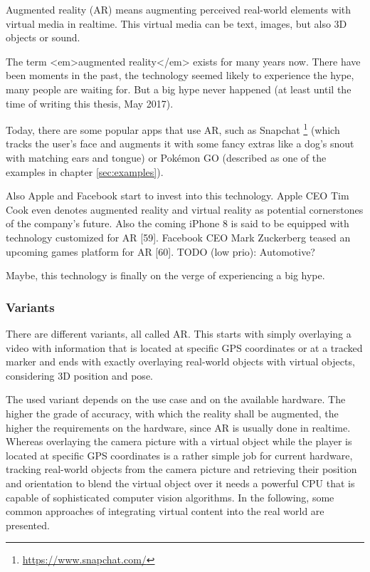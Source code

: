 Augmented reality (AR) means augmenting perceived real-world elements with virtual media in realtime. This virtual media can be text, images, but also 3D objects or sound.

The term <em>augmented reality</em> exists for many years now. There have been moments in the past, the technology seemed likely to experience the hype, many people are waiting for. But a big hype never happened (at least until the time of writing this thesis, May 2017).

Today, there are some popular apps that use AR, such as Snapchat \footnote{\url{https://www.snapchat.com/}} (which tracks the user's face and augments it with some fancy extras like a dog's snout with matching ears and tongue) or Pokémon GO (described as one of the examples in chapter \ref{sec:examples}).

Also Apple and Facebook start to invest into this technology. Apple CEO Tim Cook even denotes augmented reality and virtual reality as potential cornerstones of the company's future. Also the coming iPhone 8 is said to be equipped with technology customized for AR [59]. Facebook CEO Mark Zuckerberg teased an upcoming games platform for AR [60]. TODO (low prio): Automotive?

Maybe, this technology is finally on the verge of experiencing a big hype.

\subsubsection{Variants}
There are different variants, all called AR. This starts with simply overlaying a video with information that is located at specific GPS coordinates or at a tracked marker and ends with exactly overlaying real-world objects with virtual objects, considering 3D position and pose.

The used variant depends on the use case and on the available hardware. The higher the grade of accuracy, with which the reality shall be augmented, the higher the requirements on the hardware, since AR is usually done in realtime. Whereas overlaying the camera picture with a virtual object while the player is located at specific GPS coordinates is a rather simple job for current hardware, tracking real-world objects from the camera picture and retrieving their position and orientation to blend the virtual object over it needs a powerful CPU that is capable of sophisticated computer vision algorithms. In the following, some common approaches of integrating virtual content into the real world are presented.

